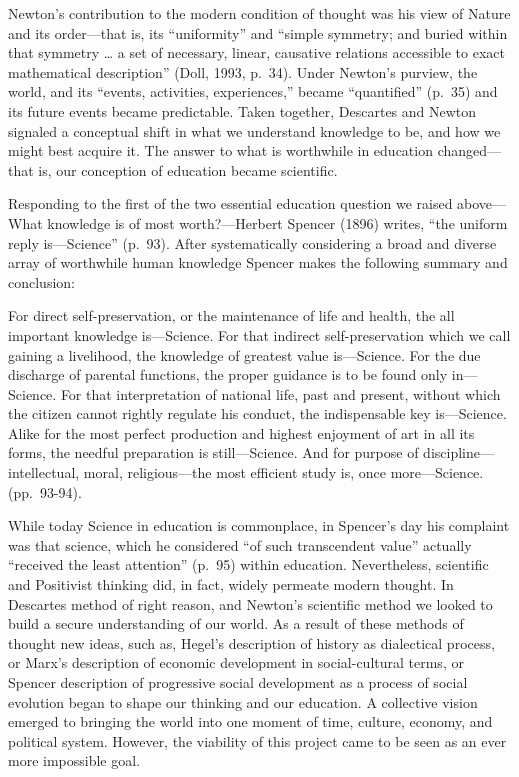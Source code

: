 \documentclass[
]{book}
\begin{document}
Newton's contribution to the modern condition of thought was his view of Nature and its order---that is, its ``uniformity'' and ``simple symmetry; and buried within that symmetry \ldots{} a set of necessary, linear, causative relations accessible to exact mathematical description'' (Doll, 1993, p.~34). Under Newton's purview, the world, and its ``events, activities, experiences,'' became ``quantified'' (p.~35) and its future events became predictable. Taken together, Descartes and Newton signaled a conceptual shift in what we understand knowledge to be, and how we might best acquire it. The answer to what is worthwhile in education changed---that is, our conception of education became scientific.

Responding to the first of the two essential education question we raised above---What knowledge is of most worth?---Herbert Spencer (1896) writes, ``the uniform reply is---Science'' (p.~93). After systematically considering a broad and diverse array of worthwhile human knowledge Spencer makes the following summary and conclusion:

For direct self-preservation, or the maintenance of life and health, the all important knowledge is---Science. For that indirect self-preservation which we call gaining a livelihood, the knowledge of greatest value is---Science. For the due discharge of parental functions, the proper guidance is to be found only in---Science. For that interpretation of national life, past and present, without which the citizen cannot rightly regulate his conduct, the indispensable key is---Science. Alike for the most perfect production and highest enjoyment of art in all its forms, the needful preparation is still---Science. And for purpose of discipline---intellectual, moral, religious---the most efficient study is, once more---Science. (pp.~93-94).

While today Science in education is commonplace, in Spencer's day his complaint was that science, which he considered ``of such transcendent value'' actually ``received the least attention'' (p.~95) within education. Nevertheless, scientific and Positivist thinking did, in fact, widely permeate modern thought. In Descartes method of right reason, and Newton's scientific method we looked to build a secure understanding of our world. As a result of these methods of thought new ideas, such as, Hegel's description of history as dialectical process, or Marx's description of economic development in social-cultural terms, or Spencer description of progressive social development as a process of social evolution began to shape our thinking and our education. A collective vision emerged to bringing the world into one moment of time, culture, economy, and political system. However, the viability of this project came to be seen as an ever more impossible goal.
\end{document}
